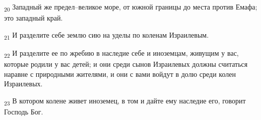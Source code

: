 \begin{tcolorbox}
\textsubscript{20} Западный же предел--великое море, от южной границы до места против Емафа; это западный край.
\end{tcolorbox}
\begin{tcolorbox}
\textsubscript{21} И разделите себе землю сию на уделы по коленам Израилевым.
\end{tcolorbox}
\begin{tcolorbox}
\textsubscript{22} И разделите ее по жребию в наследие себе и иноземцам, живущим у вас, которые родили у вас детей; и они среди сынов Израилевых должны считаться наравне с природными жителями, и они с вами войдут в долю среди колен Израилевых.
\end{tcolorbox}
\begin{tcolorbox}
\textsubscript{23} В котором колене живет иноземец, в том и дайте ему наследие его, говорит Господь Бог.
\end{tcolorbox}

